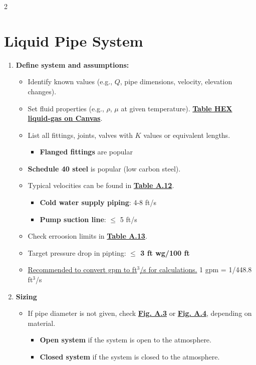 \begin{multicols*}{2}
    \section{Liquid Pipe System}
    \begin{enumerate}
        \item \textbf{Define system and assumptions:}
              \begin{itemize}
                  \item Identify known values (e.g., $Q$, pipe dimensions, velocity, elevation changes).
                  \item Set fluid properties (e.g., $\rho$, $\mu$ at given temperature). \underline{\textbf{Table HEX liquid-gas on Canvas}}.
                  \item List all fittings, joints, valves with $K$ values or equivalent lengths.
                        \begin{itemize}
                            \item \textbf{Flanged fittings} are popular
                        \end{itemize}
                        \item \textbf{Schedule 40 steel} is popular (low carbon steel).
                  \item Typical velocities can be found in \underline{\textbf{Table A.12}}.
                        \begin{itemize}
                            \item \textbf{Cold water supply piping}: 4-8 ft/s
                            \item \textbf{Pump suction line}: $\leq$ 5 ft/s
                        \end{itemize}
                  \item Check erroosion limits in \underline{\textbf{Table A.13}}.
                  \item Target pressure drop in pipting: \textbf{$\leq$ 3 ft wg/100 ft}
                  \item \underline{Recommended to convert gpm to ft$^3$/s for calculations.} 1 gpm = 1/448.8 ft$^3$/s
              \end{itemize}
        \item \textbf{Sizing}
              \begin{itemize}
                  \item If pipe diameter is not given, check \underline{\textbf{Fig. A.3}} or \underline{\textbf{Fig. A.4}}, depending on material.
                        \begin{itemize}
                            \item \textbf{Open system} if the system is open to the atmosphere.
                            \item \textbf{Closed system} if the system is closed to the atmosphere.
                        \end{itemize}
              \end{itemize}


\end{enumerate}
\end{multicols*}
